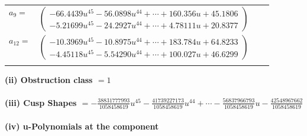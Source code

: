 \documentclass[1p]{elsarticle_modified}
\theoremstyle{definition}
\begin{document}
\begin{tabular}{m{7pt} m{180pt} m{7pt} m{180pt} }
\flushright $a_{9}=$&$\begin{pmatrix}-66.4439 u^{45}-56.0898 u^{44}+\cdots+160.356 u+45.1806\\-5.21699 u^{45}-24.2927 u^{44}+\cdots+4.78111 u+20.8377\end{pmatrix}$ \\
\flushright $a_{12}=$&$\begin{pmatrix}-10.3969 u^{45}-10.8975 u^{44}+\cdots+183.784 u+64.8233\\-4.45118 u^{45}-5.54290 u^{44}+\cdots+100.027 u+46.6299\end{pmatrix}$\\&\end{tabular}
\flushleft \textbf{(ii) Obstruction class $= 1$}\\~\\
\flushleft \textbf{(iii) Cusp Shapes $= -\frac{38831777993}{1058458619} u^{45}-\frac{41739227173}{1058458619} u^{44}+\cdots-\frac{56837966793}{1058458619} u-\frac{42548967662}{1058458619}$}\\~\\
\newpage\renewcommand{\arraystretch}{1}
\flushleft \textbf{(iv) u-Polynomials at the component}\newline \\
\end{document}
